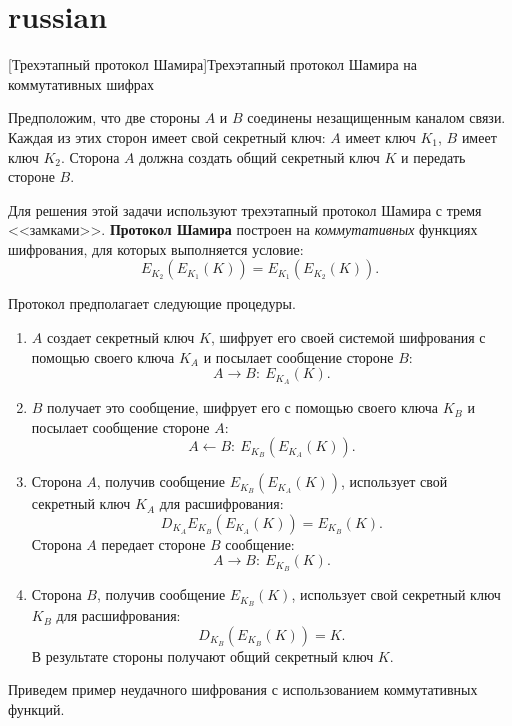 \section{russian}[Трехэтапный протокол Шамира]{Трехэтапный протокол Шамира на коммутативных шифрах}

Предположим, что две стороны $A$ и $B$ соединены незащищенным каналом связи. Каждая из этих сторон имеет свой секретный ключ: $A$ имеет ключ $K_1$, $B$ имеет ключ $K_2$. Сторона $A$ должна создать общий секретный ключ $K$ и передать стороне $B$.

Для решения этой задачи используют трехэтапный протокол Шамира  с тремя <<замками>>. \textbf{Протокол Шамира} построен на  \emph{коммутативных} функциях шифрования, для которых выполняется условие:
    \[ E_{K_{2}} (E_{K_{1}}(K))=E_{K_{1}} (E_{K_{2}}(K)). \]

Протокол предполагает следующие процедуры.
\begin{enumerate}
    \item $A$ создает секретный ключ $K$, шифрует его своей системой шифрования с помощью своего ключа $K_A$ и посылает сообщение стороне $B$:
        \[ A \rightarrow B: ~ E_{K_A}(K). \]
    \item $B$ получает это сообщение, шифрует его с помощью своего ключа $K_B$ и посылает сообщение стороне $A$:
        \[ A \leftarrow B: ~ E_{K_B}( E_{K_A}( K)). \]
    \item Сторона $A$, получив сообщение $E_{K_B}(E_{K_A}(K))$, использует  свой секретный ключ $K_A$ для расшифрования:
            \[ D_{K_A} E_{K_B} (E_{K_A}(K)) = E_{K_B}(K). \]
        Сторона $A$ передает стороне $B$ сообщение:
        \[ A \rightarrow B: ~ E_{K_B}(K). \]
    \item Сторона $B$, получив сообщение $E_{K_B}(K)$, использует свой секретный ключ $K_B$ для расшифрования:
            \[ D_{K_B}(E_{K_B}(K)) = K. \]
        В результате стороны получают общий секретный ключ $K$.
\end{enumerate}

Приведем пример неудачного шифрования с использованием коммутативных функций.

